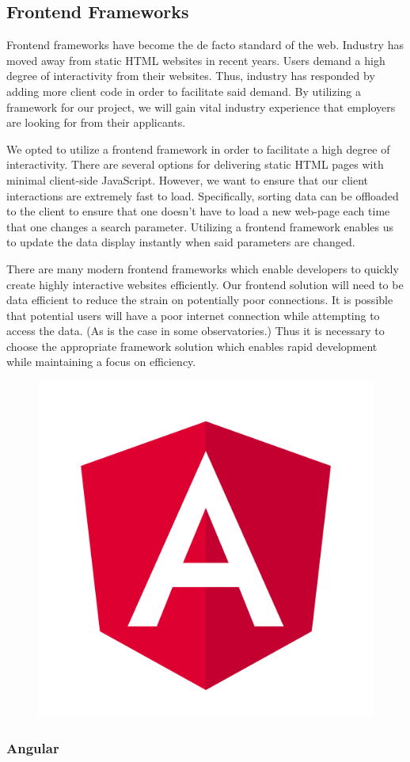 \documentclass[12pt]{report}
\begin{document}
\subsection*{Frontend Frameworks}

Frontend frameworks have become the de facto standard of the web. Industry has moved away from static HTML websites in recent years. Users demand a high degree of interactivity from their websites. Thus, industry has responded by adding more client code in order to facilitate said demand. By utilizing a framework for our project, we will gain vital industry experience that employers are looking for from their applicants.

We opted to utilize a frontend framework in order to facilitate a high degree of interactivity. There are several options for delivering static HTML pages with minimal client-side JavaScript. However, we want to ensure that our client interactions are extremely fast to load. Specifically, sorting data can be offloaded to the client to ensure that one doesn't have to load a new web-page each time that one changes a search parameter. Utilizing a frontend framework enables us to update the data display instantly when said parameters are changed.

There are many modern frontend frameworks which enable developers to quickly create highly interactive websites efficiently. Our frontend solution will need to be data efficient to reduce the strain on potentially poor connections. It is possible that potential users will have a poor internet connection while attempting to access the data. (As is the case in some observatories.) Thus it is necessary to choose the appropriate framework solution which enables rapid development while maintaining a focus on efficiency.

\begin{figure}[h]
	\centering
	\includegraphics[width=0.251\linewidth]{angular}
\end{figure}

\subsubsection*{Angular}
\end{document}

